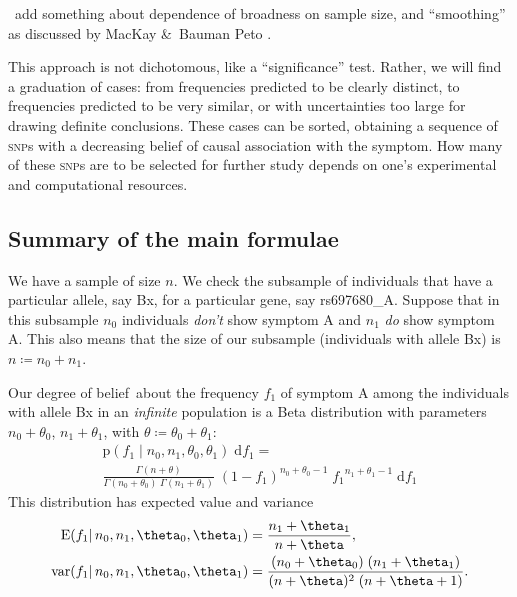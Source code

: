 \documentclass[\ifafour a4paper,12pt,\else a5paper,10pt,\fi%
onecolumn,oneside,article,%
british%
]{memoir}
\theoremstyle{remark}
\theoremstyle{innote}
\newcommand*{\citey}{\parencites*}
\newcommand*{\amp}{\&}
\newcommand*{\di}{\mathrm{d}}%
\newcommand*{\defd}{\coloneqq}
\newcommand*{\pf}{\mathrm{p}}%
\renewcommand*{\|}{\mathpunct{|}}
\newcommand*{\sect}{\S}%
\newcommand*{\E}{\mathrm{E}}
\DeclarePairedDelimiter\expp{(}{)}
\newcommand*{\expe}{\E\expp}%
\newcommand*{\puzzle}{\maltese}
\newcommand{\mynote}[1]{ {\color{notecolour}\puzzle\ #1}}
\DeclareMathOperator{\var}{var}
\newcommand*{\dob}{degree of belief}
\newcommand*{\snp}{\textsc{snp}}
\begin{document}
\mynote{add something about dependence of broadness on sample size, and
  \enquote{smoothing} as discussed by MacKay \amp\ Bauman Peto
  \citey[\sect~2.6]{mackayetal1995}.}

This approach is not dichotomous, like a \enquote{significance} test.
Rather, we will find a graduation of cases: from frequencies predicted to
be clearly distinct, to frequencies predicted to be very similar, or with
uncertainties too large for drawing definite conclusions. These cases can
be sorted, obtaining a sequence of \snp s with a decreasing belief of causal
association with the symptom. How many of these \snp s are to be selected for
further study depends on one's experimental and computational resources.





\subsection{Summary of the main formulae}

We have a sample of size $n$. We check the subsample of individuals that
have a particular allele, say Bx, for a particular gene, say rs697680\_A.
Suppose that in this subsample $n_0$ individuals \emph{don't} show symptom
A and $n_1$ \emph{do} show symptom A. This also means that the size of our
subsample (individuals with allele Bx) is $n \defd n_0+n_1$.

Our \dob\ about the frequency $f_1$ of symptom A among the individuals with
allele Bx in an \emph{infinite} population is a Beta distribution with
parameters $n_0+\theta_0$, $n_1+\theta_1$, with
$\theta \defd \theta_0+\theta_1$:
\begin{multline}
  \label{eq:beta_fr}
  \pf(f_1 \| n_0,n_1,\theta_0,\theta_1)\;\di f_1 ={}\\
  \frac{\Gamma(n+\theta)}{\Gamma(n_0+\theta_0)\;\Gamma(n_1+\theta_1)}
  \; (1-f_1)^{n_0+\theta_0-1}\;{f_1}^{n_1+\theta_1-1} \;\di f_1
\end{multline}
This distribution has expected value and variance
\begin{equation}
  \label{eq:exp_value}
  \begin{split}
  \expe{f_1 \| n_0, n_1, \theta_0,\theta_1} &= \frac{n_1+\theta_1}{n+\theta},
  \\
  \var(f_1 \|  n_0, n_1, \theta_0,\theta_1) &=
  \frac{(n_0+\theta_0)\;(n_1+\theta_1)}{(n+\theta)^2\;(n+\theta+1)}.
\end{split}
\end{equation}
\end{document}
